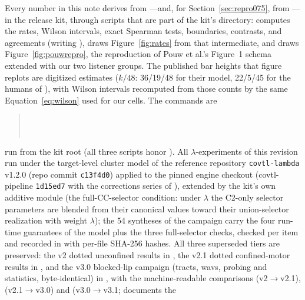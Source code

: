 \documentclass[11pt,a4paper]{article}
\newcommand{\lam}{\lambda}
\begin{document}
Every number in this note derives from
---and, for
Section~\ref{sec:repro075}, from ---in
the release kit, through scripts that are part of the kit's
 directory:
 computes the rates, Wilson intervals, exact
Spearman tests, boundaries, contrasts, and agreements (writing
),  draws
Figure~\ref{fig:rates} from that intermediate, and
 draws Figure~\ref{fig:pouwrepro}, the
reproduction of Pouw et al.'s Figure~1 schema extended with our two
listener groups. The published bar heights that figure replots are
digitized estimates ($k/48$: 36/19/48 for their model, 22/5/45 for
the humans of \citealp{darcy2009}), with Wilson intervals
recomputed from those counts by the same
Equation~\ref{eq:wilson} used for our cells. The commands are
\begin{quote}
\footnotesize
{}\\
\\
\end{quote}
run from the kit root (all three scripts honor
). All $\lam$-experiments of this revision run
under the target-level cluster model of the reference repository
\texttt{covtl-lambda} v1.2.0 (repo commit \texttt{c13f4d0}) applied
to the pinned engine checkout (covtl-pipeline \texttt{1d15ed7} with
the corrections series of ),
extended by the kit's own additive module
 (the full-CC-selector condition:
under $\lam$ the C2-only selector parameters are blended from their
canonical values toward their union-selector realization with weight
$\lam$); the 54 syntheses of the campaign carry the four run-time
guarantees of the model plus the three full-selector checks, checked
per item and recorded in  with
per-file SHA-256 hashes. All three superseded tiers are preserved:
the v2 dotted unconfined results in ,
the v2.1 dotted confined-motor results in
, and the v3.0 blocked-lip campaign
(tracts, wavs, probing and statistics, byte-identical) in
, with the machine-readable
comparisons 
(v2$\rightarrow$v2.1), 
(v2.1$\rightarrow$v3.0) and 
(v3.0$\rightarrow$v3.1;  documents the
\end{document}
